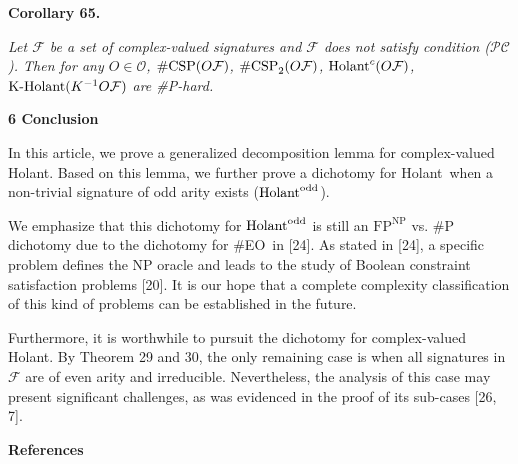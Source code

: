 \documentclass[10pt,a4paper]{article}
\begin{document}


\par\medskip\noindent\textbf{
\textbf{Corollary 65}\textbf{.}
}\par



\emph{Let $\mathcal{F}$ be a set of complex-valued signatures and $\mathcal{F}$ does not satisfy condition ($\mathcal{PC}$). Then for any $O\in\mathscr{O}$, $\textup{{\#CSP}}(O\mathcal{F})$, $\textup{{\#CSP}}_{2}(O\mathcal{F})$, $\textup{{Holant}}^{c}(O\mathcal{F})$, $\textup{{K-Holant}}(K^{-1}O\mathcal{F})$ are \#P-hard.}\par








\par\medskip\noindent\textbf{
6 Conclusion}\par




In this article, we prove a generalized decomposition lemma for complex-valued Holant. Based on this lemma, we further prove a dichotomy for Holant when a non-trivial signature of odd arity exists ($\textup{{Holant}}^{\text{odd}}$).\par




We emphasize that this dichotomy for $\textup{{Holant}}^{\text{odd}}$ is still an $\text{FP}^{\text{NP}}$ vs. \#P dichotomy due to the dichotomy for \#EO in [24]. As stated in [24], a specific problem defines the NP oracle and leads to the study of Boolean constraint satisfaction problems [20]. It is our hope that a complete complexity classification of this kind of problems can be established in the future.\par




Furthermore, it is worthwhile to pursuit the dichotomy for complex-valued Holant. By Theorem 29 and 30, the only remaining case is when all signatures in $\mathcal{F}$ are of even arity and irreducible. Nevertheless, the analysis of this case may present significant challenges, as was evidenced in the proof of its sub-cases [26, 7].\par





\par\medskip\noindent\textbf{References}\par
\end{document}

